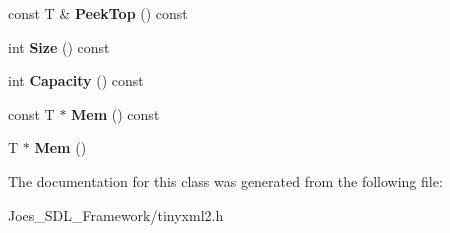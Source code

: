 \begin{DoxyCompactItemize}
\item 
\hypertarget{classtinyxml2_1_1_dyn_array_a9c2282ea8901b5a92ccaac2e6166a788}{const T \& {\bfseries Peek\-Top} () const }\label{classtinyxml2_1_1_dyn_array_a9c2282ea8901b5a92ccaac2e6166a788}

\item 
\hypertarget{classtinyxml2_1_1_dyn_array_a1299b257b62ea6b4983c488867f219b0}{int {\bfseries Size} () const }\label{classtinyxml2_1_1_dyn_array_a1299b257b62ea6b4983c488867f219b0}

\item 
\hypertarget{classtinyxml2_1_1_dyn_array_a8edbe90ed53b2e46b1b5cf53b261e4e7}{int {\bfseries Capacity} () const }\label{classtinyxml2_1_1_dyn_array_a8edbe90ed53b2e46b1b5cf53b261e4e7}

\item 
\hypertarget{classtinyxml2_1_1_dyn_array_a1f39330daeb97d3d1dc3fc12dcf7ac67}{const T $\ast$ {\bfseries Mem} () const }\label{classtinyxml2_1_1_dyn_array_a1f39330daeb97d3d1dc3fc12dcf7ac67}

\item 
\hypertarget{classtinyxml2_1_1_dyn_array_a0e0d60b399d54fad5b33d5008bc59c8e}{T $\ast$ {\bfseries Mem} ()}\label{classtinyxml2_1_1_dyn_array_a0e0d60b399d54fad5b33d5008bc59c8e}

\end{DoxyCompactItemize}


The documentation for this class was generated from the following file\-:\begin{DoxyCompactItemize}
\item 
Joes\-\_\-\-S\-D\-L\-\_\-\-Framework/tinyxml2.\-h\end{DoxyCompactItemize}
